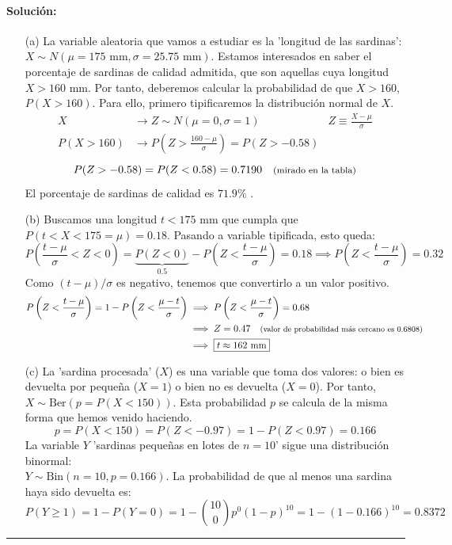 \paragraph{Solución:}
\begin{enumerate}
    \item[(a)] La variable aleatoria que vamos a estudiar es la 'longitud de las sardinas': \\$X\sim N(\mu =175 \text{ mm}, \sigma =25.75 \text{ mm})$. Estamos interesados en saber el porcentaje de sardinas de calidad admitida, que son aquellas cuya longitud $X>160$ mm. Por tanto, deberemos calcular la probabilidad de que $X>160$, $P(X>160).$ Para ello, primero tipificaremos la distribución normal de $X$.
    \begin{align*}
        X&\longrightarrow Z\sim N(\mu =0 , \sigma =1) & Z\equiv \frac{X-\mu }{\sigma }\\
        P(X>160) &\longrightarrow P\left (Z>\frac{160-\mu }{\sigma }\right )=P(Z>-0.58)&
    \end{align*}
    $$
    P(Z>-0.58)=P(Z<0.58)=0.7190 \quad \text{\footnotesize (mirado en la tabla)}
    $$
    El porcentaje de sardinas de calidad es $\boxed{71.9 \%}$ .

    \item[(b)] Buscamos una longitud $t<175$ mm que cumpla que $P(t<X<175=\mu )=0.18$. Pasando a variable tipificada, esto queda:
    $$
    P\left ( \frac{t-\mu }{\sigma }<Z<0 \right )=\underbrace{P(Z<0)}_{0.5}-P\left (Z<\frac{t-\mu }{\sigma } \right )=0.18 \implies P\left (Z<\frac{t-\mu }{\sigma } \right )=0.32
    $$
    Como $(t-\mu) /\sigma $ es negativo, tenemos que convertirlo a un valor positivo. 
    \begin{equation*}
        \begin{split}
            P\left (Z<\frac{t-\mu }{\sigma } \right ) = 1- P\left (Z<\frac{\mu -t }{\sigma } \right )&\implies P\left (Z<\frac{\mu -t }{\sigma } \right )=0.68\\
            &\implies Z=0.47 \quad \text{\footnotesize (valor de probabilidad más cercano es $0.6808$)} \\&\implies \boxed{t\approx 162 \text{ mm}}
        \end{split}
    \end{equation*}

    \item[(c)] La 'sardina procesada' ($X$) es una variable que toma dos valores: o bien es devuelta por pequeña ($X=1$) o bien no es devuelta ($X=0$). Por tanto, $X\sim \text{Ber}(p=P(X<150))$. Esta probabilidad $p$ se calcula de la misma forma que hemos venido haciendo.
    $$
    p=P(X<150)=P(Z<-0.97)=1-P(Z<0.97)=0.166
    $$
    La variable $Y$ 'sardinas pequeñas en lotes de $n=10$' sigue una distribución binormal:\\ $Y\sim \text{Bin}(n=10,p=0.166)$. La probabilidad de que al menos una sardina haya sido devuelta es:
    $$
    P(Y\ge 1)=1-P(Y=0)=1-\binom{10}{0}p^0 (1-p)^{10} = 1-(1-0.166)^{10}=\boxed{0.8372}
    $$
\end{enumerate} 

\noindent\rule{\textwidth}{0.5pt}